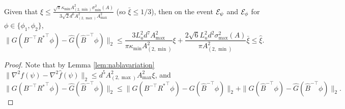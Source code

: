 \begin{lemma}
\label{lem:Binversenablavariation}
Given that $\xi \le \frac{\sqrt{\pi}\kappa_{\min}A^2_{(2,\min)}\sigma_{\min}^2(A)}{3\sqrt{2}d^6A_{(2,\max)}^2A_{\max}^2}$
(so $\bar{\xi} \le 1/3$), then on the event $\mathcal{E}_{\psi}$ and $\mathcal{E}_{\phi}$ for $\phi \in \{\phi_1, \phi_2\}$,
\[
\|G(B^{-\top}{R^*}^{\top}\phi) - \widehat{G}(\widehat{B}^{-\top}\phi)\|_2
\le 
\frac{3L_u^2d^7A^2_{\max}}{\pi\kappa_{\min}A^2_{(2,\min)}}\xi + \frac{2\sqrt{6}L_u^2d^2\sigma_{\max}^2(A)}{\pi A^2_{(2,\min)}}\bar{\xi}
\le \widehat{\xi}.
\]
\end{lemma}
\begin{proof}
Note that by Lemma \ref{lem:nablavariation} $\|\nabla^2 f(\psi) - \nabla^2 \widehat{f}(\psi)\|_2 \le d^5  A_{(2,\max)}^2A_{\max}^2\xi$, and 
\[
\|G(B^{-\top}R{^*}^{\top}\phi) - \widehat{G}(\widehat{B}^{-\top}\phi)\|_2
\le 
\|G(B^{-\top}{R^*}^{\top}\phi) - G(\widehat{B}^{-\top}\phi)\|_2
+ \|G(\widehat{B}^{-\top}\phi) - \widehat{G}(\widehat{B}^{-\top}\phi)\|_2.
\]


\end{proof}
